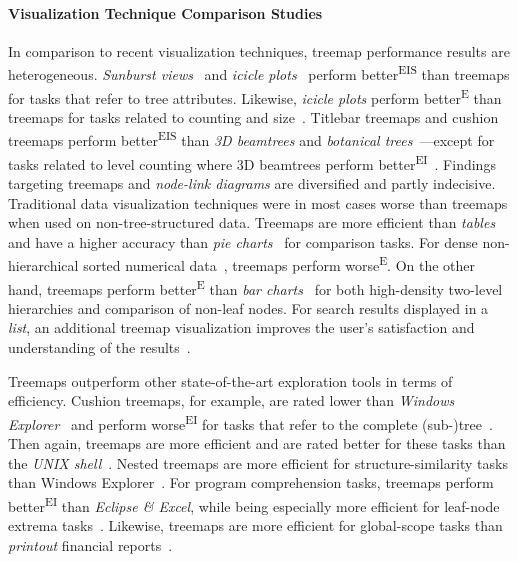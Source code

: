 \documentclass[sigconf,
natbib=true]{acmart}
\begin{document}


\paragraph{\textbf{Visualization Technique Comparison Studies}}
In comparison to recent visualization techniques, treemap performance results are heterogeneous.
\emph{Sunburst views}~\cite{stasko2000-structures,barlow2001-comparison} and \emph{icicle plots}~\cite{barlow2001-comparison} perform better\textsuperscript{EIS} than treemaps for tasks that refer to tree attributes.
Likewise, \emph{icicle plots} perform better\textsuperscript{E} than treemaps for tasks related to counting and size~\cite{mueller2013-eyetracking,mueller2017-perception}.
Titlebar treemaps and cushion treemaps perform better\textsuperscript{EIS} than \emph{3D beamtrees} and \emph{botanical trees}~\cite{kobsa2004-systems}---except for tasks related to level counting where 3D beamtrees perform better\textsuperscript{EI}~\cite{vanHam2003-beamtrees,kobsa2004-systems}.
Findings targeting treemaps and \emph{node-link diagrams} are diversified and partly indecisive.
Traditional data visualization techniques were in most cases worse than treemaps when used on non-tree-structured data.
Treemaps are more efficient than \emph{tables}~\cite{johnson1993-categorical,goldberg2005-monitoring} and have a higher accuracy than \emph{pie charts}~\cite{huestegge2018-processes} for comparison tasks.
For dense non-hierarchical sorted numerical data~\cite{yalcin2017-wrappedbars}, treemaps perform worse\textsuperscript{E}.
On the other hand, treemaps perform better\textsuperscript{E} than \emph{bar charts}~\cite{kong2010-guidelines} for both high-density two-level hierarchies and comparison of non-leaf nodes.
For search results displayed in a \emph{list}, an additional treemap visualization improves the user's satisfaction and understanding of the results~\cite{chu2007-searchengine,clarkson2009-resultmaps}.

Treemaps outperform other state-of-the-art exploration tools in terms of efficiency.
Cushion treemaps, for example, are rated lower than \emph{Windows Explorer}~\cite{kobsa2004-systems,andrews2007-hvte} and perform worse\textsuperscript{EI} for tasks that refer to the complete (sub-)tree~\cite{kobsa2004-systems}.
Then again, treemaps are more efficient and are rated better for these tasks than the \emph{UNIX shell}~\cite{johnson1993-categorical,turo1992-improve}.
Nested treemaps are more efficient for structure-similarity tasks than Windows Explorer~\cite{wang2006-knowledgediscovery}.
For program comprehension tasks, treemaps perform better\textsuperscript{EI} than \emph{Eclipse \& Excel}, while being especially more efficient for leaf-node extrema tasks~\cite{wettel2011-softwarecities}.
Likewise, treemaps are more efficient for global-scope tasks than \emph{printout} financial reports~\cite{turo1992-improve}.
\end{document}
